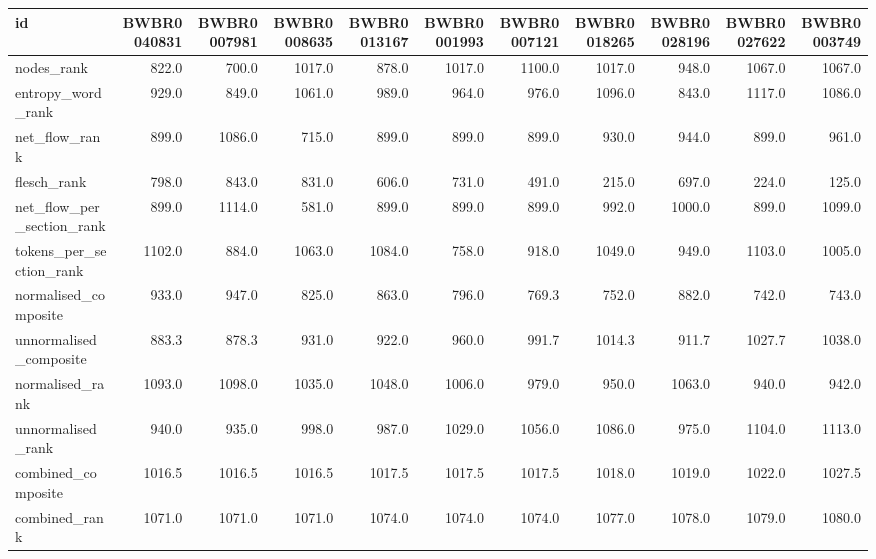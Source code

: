 \begin{tabular}{lrrrrrrrrrr}
\toprule
id & BWBR0040831 & BWBR0007981 & BWBR0008635 & BWBR0013167 & BWBR0001993 & BWBR0007121 & BWBR0018265 & BWBR0028196 & BWBR0027622 & BWBR0003749 \\
\midrule
nodes\_rank & 822.0 & 700.0 & 1017.0 & 878.0 & 1017.0 & 1100.0 & 1017.0 & 948.0 & 1067.0 & 1067.0 \\
\cline{1-11}
entropy\_word\_rank & 929.0 & 849.0 & 1061.0 & 989.0 & 964.0 & 976.0 & 1096.0 & 843.0 & 1117.0 & 1086.0 \\
\cline{1-11}
net\_flow\_rank & 899.0 & 1086.0 & 715.0 & 899.0 & 899.0 & 899.0 & 930.0 & 944.0 & 899.0 & 961.0 \\
\cline{1-11}
flesch\_rank & 798.0 & 843.0 & 831.0 & 606.0 & 731.0 & 491.0 & 215.0 & 697.0 & 224.0 & 125.0 \\
\cline{1-11}
net\_flow\_per\_section\_rank & 899.0 & 1114.0 & 581.0 & 899.0 & 899.0 & 899.0 & 992.0 & 1000.0 & 899.0 & 1099.0 \\
\cline{1-11}
tokens\_per\_section\_rank & 1102.0 & 884.0 & 1063.0 & 1084.0 & 758.0 & 918.0 & 1049.0 & 949.0 & 1103.0 & 1005.0 \\
\cline{1-11}
normalised\_composite & 933.0 & 947.0 & 825.0 & 863.0 & 796.0 & 769.3 & 752.0 & 882.0 & 742.0 & 743.0 \\
\cline{1-11}
unnormalised\_composite & 883.3 & 878.3 & 931.0 & 922.0 & 960.0 & 991.7 & 1014.3 & 911.7 & 1027.7 & 1038.0 \\
\cline{1-11}
normalised\_rank & 1093.0 & 1098.0 & 1035.0 & 1048.0 & 1006.0 & 979.0 & 950.0 & 1063.0 & 940.0 & 942.0 \\
\cline{1-11}
unnormalised\_rank & 940.0 & 935.0 & 998.0 & 987.0 & 1029.0 & 1056.0 & 1086.0 & 975.0 & 1104.0 & 1113.0 \\
\cline{1-11}
combined\_composite & 1016.5 & 1016.5 & 1016.5 & 1017.5 & 1017.5 & 1017.5 & 1018.0 & 1019.0 & 1022.0 & 1027.5 \\
\cline{1-11}
combined\_rank & 1071.0 & 1071.0 & 1071.0 & 1074.0 & 1074.0 & 1074.0 & 1077.0 & 1078.0 & 1079.0 & 1080.0 \\
\cline{1-11}
\bottomrule
\end{tabular}
